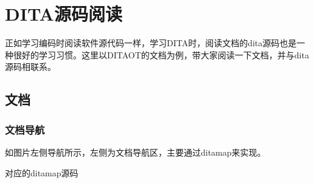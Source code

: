 \documentclass[letterpaper,10pt,english]{sphinxmanual}
\begin{document}
\sphinxstepscope


\chapter{DITA源码阅读}
\label{\detokenize{dita-examples/dita-source-reading:dita}}\label{\detokenize{dita-examples/dita-source-reading::doc}}
\sphinxAtStartPar
正如学习编码时阅读软件源代码一样，学习DITA时，阅读文档的dita源码也是一种很好的学习习惯。这里以DITA\sphinxhyphen{}OT的文档为例，带大家阅读一下文档，并与dita源码相联系。


\section{文档}
\label{\detokenize{dita-examples/dita-source-reading:id1}}

\subsection{文档导航}
\label{\detokenize{dita-examples/dita-source-reading:id2}}
\sphinxAtStartPar
如图片左侧导航所示，左侧为文档导航区，主要通过ditamap来实现。

\sphinxAtStartPar
{}

\sphinxAtStartPar
对应的ditamap源码
\end{document}
